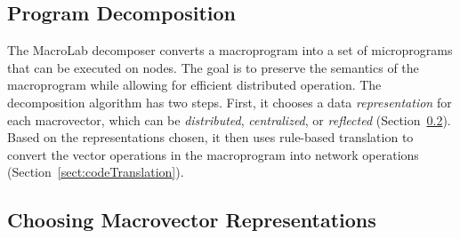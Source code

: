 \subsection{Program Decomposition} \label{sect:decomposer}



The MacroLab decomposer converts a macroprogram into a set of
microprograms that can be executed on nodes.  The goal is to preserve
the semantics of the macroprogram while allowing for efficient
distributed operation.  The decomposition algorithm has two
steps. First, it chooses a data {\em representation} for each
macrovector, which can be {\em distributed}, {\em centralized}, or
{\em reflected} (Section~\ref{sect:decompositionTypes}).  Based on the
representations chosen, it then uses rule-based translation to convert
the vector operations in the macroprogram into network operations (Section~\ref{sect:codeTranslation}).


\subsection{Choosing Macrovector Representations}\label{sect:decompositionTypes}

